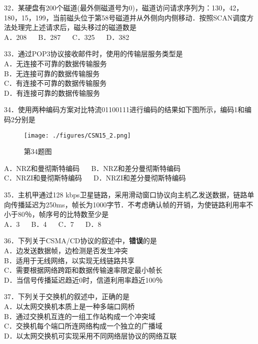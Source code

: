 32．某硬盘有200个磁道(最外侧磁道号为0)，磁道访问请求序列为：130，42，180，15，199，当前磁头位于第58号磁道并从外侧向内侧移动．按照SCAN调度方法处理完上述请求后，磁头移过的磁道数是 \\
A．208 $\quad$ B．287 $\quad$ C．325 $\quad$ D．382

33．通过POP3协议接收邮件时，使用的传输层服务类型是 \\
A．无连接不可靠的数据传输服务 \\
B．无连接可靠的数据传输服务 \\
C．有连接不可靠的数据传输服务 \\
D．有连接可靠的数据传输服务

34．使用两种编码方案对比特流01100111进行编码的结果如下图所示，编码1和编码2分别是
\begin{figure}[ht]
\centering
\texttt{[image: ./figures/CSN15\_2.png]}
\caption{第34题图} \label{CSN15_fig2}
\end{figure}
A．NRZ和曼彻斯特编码 $\quad$ B．NRZ和差分曼彻斯特编码 \\
C．NRZI和曼彻斯特编码 $\quad$ D．NRZI和差分曼彻斯特编码

35．主机甲通过128 kbps卫星链路，采用滑动窗口协议向主机乙发送数据，链路单向传播延迟为250ms，帧长为1000字节．不考虑确认帧的开销，为使链路利用率不小于80％，帧序号的比特数至少是 \\
A．3 $\quad$ B．4 $\quad$ C．7 $\quad$ D．8

36．下列关于CSMA/CD协议的叙述中，\textbf{错误}的是 \\
A．边发送数据帧，边检测是否发生冲突 \\
B．适用于无线网络，以实现无线链路共享 \\
C．需要根据网络跨距和数据传输速率限定最小帧长 \\
D．当信号传播延迟趋近0时，信道利用率趋近100％

37．下列关于交换机的叙述中，正确的是 \\
A．以太网交换机本质上是一种多端口网桥 \\
B．通过交换机互连的一组工作站构成一个冲突域 \\
C．交换机每个端口所连网络构成一个独立的广播域 \\
D．以太网交换机可实现采用不同网络层协议的网络互联

